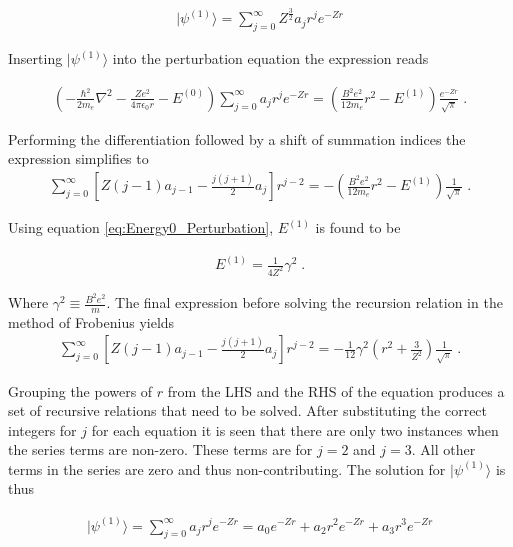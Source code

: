         \begin{align}
            \vert \psi^{(1)} \rangle = \sum_{j = 0}^\infty Z^{\frac{3}{2}} a_j r^j e^{-Zr}
        \end{align}

        \noindent Inserting $\vert \psi^{(1)} \rangle$ into the perturbation equation the expression reads 

        \begin{align}
            \left(- \frac{\hbar^2}{2m_e} \nabla^2 - \frac{Ze^2}{4\pi \epsilon_0 r} - E^{(0)} \right) \sum_{j = 0}^\infty a_j r^j e^{-Zr} = \left(\frac{B^2e^2}{12m_e}r^2 - E^{(1)} \right) \frac{e^{-Zr}}{\sqrt{\pi}}\;.
        \end{align}

        \noindent Performing the differentiation followed by a shift of summation indices the expression simplifies to
        \begin{align}
            \sum_{j = 0}^\infty \left[ Z(j - 1)a_{j-1} - \frac{j(j+1)}{2}a_j \right]r^{j-2} = -\left(\frac{B^2e^2}{12m_e}r^2 - E^{(1)} \right) \frac{1}{\sqrt{\pi}}\;.\label{eq:Result_r^2_sum}
        \end{align}

        \noindent Using equation \eqref{eq:Energy0_Perturbation}, $E^{(1)}$ is found to be 

        \begin{align}
            E^{(1)} = \frac{1}{4Z^2} \gamma^2\;.
        \end{align}

        \noindent Where $\gamma^2 \equiv \frac{B^2 e^2}{m}$. The final expression before solving the recursion relation in the method of Frobenius yields 
        \begin{align}
            \sum_{j = 0}^\infty \left[ Z(j - 1)a_{j-1} - \frac{j(j+1)}{2}a_j \right]r^{j-2} = -\frac{1}{12} \gamma^2 \left(r^2 + \frac{3}{Z^2} \right) \frac{1}{\sqrt{\pi}}\;.
        \end{align}

        Grouping the powers of $r$ from the LHS and the RHS of the equation produces a set of recursive relations that need to be solved. After substituting the correct integers for $j$ for each equation it is seen that there are only two instances when the series terms are non-zero. These terms are for $j = 2$ and $j = 3$. All other terms in the series are zero and thus non-contributing. The solution for $\vert \psi^{(1)} \rangle$ is thus 

        \begin{align}
            \vert \psi^{(1)} \rangle = \sum_{j = 0}^\infty a_j r^j e^{-Zr} = a_0 e^{-Zr} + a_2 r^2 e^{-Zr} + a_3 r^3 e^{-Zr}
        \end{align}


